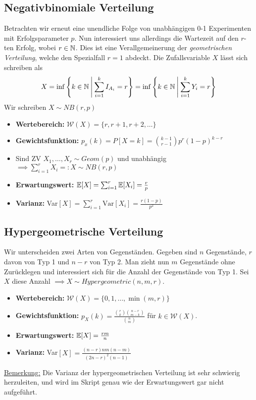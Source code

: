 \subsection{Negativbinomiale Verteilung}
Betrachten wir erneut eine unendliche Folge von unabhängigen 0-1 Experimenten mit Erfolgsparameter $p$. Nun interessiert uns allerdings die Wartezeit auf den $r$-ten Erfolg, wobei $r\in \mathbb{N}$. Dies ist eine Verallgemeinerung der \textit{geometrischen Verteilung}, welche den Spezialfall $r=1$ abdeckt. Die Zufallsvariable $X$ lässt sich schreiben als
$$ X = \inf \left\{k \in \mathbb{N} \: \middle| \: \sum_{i=1}^k I_{A_i} = r\right\} = \inf \left\{k \in \mathbb{N} \: \middle|\: \sum_{i=1}^k Y_i = r\right\}$$
Wir schreiben $X \sim NB(r,p)$
\begin{itemize}
\item \textbf{Wertebereich:} $\mathcal{W}(X) = \{r, r+1, r+2, \dots\}$
\item \textbf{Gewichtsfunktion:} $p_x(k) = P[X=k] = \binom{k-1}{r-1} p^r (1-p)^{k-r}$
\item Sind ZV $X_1,\dots,X_r \sim Geom(p)$ und unabhängig\\$\implies \sum_{i=1}^r X_i =: X \sim NB(r,p)$
\item \textbf{Erwartungswert:} $\mathbb{E}[X] = \sum_{i=1}^r \mathbb{E}[X_i] = \frac{r}{p}$
\item \textbf{Varianz:} Var$[X] = \sum_{i=1}^r \mbox{Var}[X_i] = \frac{r(1-p)}{p^2}$
\end{itemize}

\subsection{Hypergeometrische Verteilung}
Wir unterscheiden zwei Arten von Gegenständen. Gegeben sind $n$ Gegenstände, $r$ davon von Typ 1 und $n-r$ von Typ 2. Man zieht nun $m$ Gegenstände ohne Zurücklegen und interessiert sich für die Anzahl der Gegenstände von Typ 1. Sei $X$ diese Anzahl $\implies X \sim Hypergeometric(n,m,r)$.
\begin{itemize}
\item \textbf{Wertebereich:} $\mathcal{W}(X) = \{0,1, \dots, \min(m,r)\}$
\item \textbf{Gewichtsfunktion:} $p_X(k) = \frac{\binom{r}{k} \binom{n-r}{m-k}}{\binom{n}{m}}$ für $k\in \mathcal{W}(X)$.
\item \textbf{Erwartungswert:} $\mathbb{E}[X] = \frac{rm}{n}$
\item \textbf{Varianz:} Var$[X] = \frac{(n-r) n m (n-m)}{(2n-r)^2(n-1)}$
\end{itemize}
\underline{Bemerkung:} Die Varianz der hypergeometrischen Verteilung ist sehr schwierig herzuleiten, und wird im Skript genau wie der Erwartungswert gar nicht aufgeführt.

